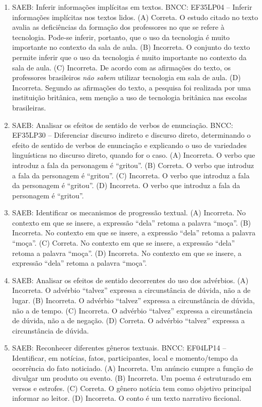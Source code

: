 \begin{enumerate}
\item
SAEB: Inferir informações implícitas em textos. BNCC: EF35LP04 -- Inferir informações implícitas nos textos lidos. 
(A) Correta. O estudo citado no texto avalia as deficiências da formação dos professores no que se refere à tecnologia. Pode-se inferir, portanto, que o uso da tecnologia é muito importante no contexto da sala de aula. 
(B) Incorreta. O conjunto do texto permite inferir que o uso da tecnologia é muito importante no contexto da sala de aula. 
(C) Incorreta. De acordo com as afirmações do texto, os professores brasileiros \textit{não sabem} utilizar tecnologia em sala de aula. 
(D) Incorreta. Segundo as afirmações do texto, a pesquisa foi realizada por uma instituição britânica, sem menção a uso de tecnologia britânica nas escolas brasileiras.

\item
SAEB: Analisar os efeitos de sentido de verbos de enunciação. BNCC: EF35LP30 -- Diferenciar discurso indireto e discurso direto, determinando o efeito de sentido de verbos de enunciação e explicando o uso de variedades linguísticas no discurso direto, quando for o caso. 
(A) Incorreta. O verbo que introduz a fala da personagem é ``gritou''. 
(B) Correta. O verbo que introduz a fala da personagem é ``gritou''. 
(C) Incorreta. O verbo que introduz a fala da personagem é ``gritou''. 
(D) Incorreta. O verbo que introduz a fala da personagem é ``gritou''.

\item
SAEB: Identificar os mecanismos de progressão textual. 
(A) Incorreta. No contexto em que se insere, a expressão ``dela'' retoma a palavra ``moça''. 
(B) Incorreta. No contexto em que se insere, a expressão ``dela'' retoma a palavra ``moça''. 
(C) Correta. No contexto em que se insere, a expressão ``dela'' retoma a palavra ``moça''. 
(D) Incorreta. No contexto em que se insere, a expressão ``dela'' retoma a palavra ``moça''.

\item
SAEB: Analisar os efeitos de sentido decorrentes do uso dos advérbios. 
(A) Incorreta. O advérbio ``talvez'' expressa a circunstância de dúvida, não a de lugar. 
(B) Incorreta. O advérbio ``talvez'' expressa a circunstância de dúvida, não a de tempo. 
(C) Incorreta. O advérbio ``talvez'' expressa a circunstância de dúvida, não a de negação. 
(D) Correta. O advérbio ``talvez'' expressa a circunstância de dúvida.

\item
SAEB: Reconhecer diferentes gêneros textuais. BNCC: EF04LP14 -- Identificar, em notícias, fatos, participantes, local e momento/tempo da ocorrência do fato noticiado. 
(A) Incorreta. Um anúncio cumpre a função de divulgar um produto ou evento. 
(B) Incorreta. Um poema é estruturado em versos e estrofes. 
(C) Correta. O gênero notícia tem como objetivo principal informar ao leitor. 
(D) Incorreta. O conto é um texto narrativo ficcional.


\end{enumerate}
